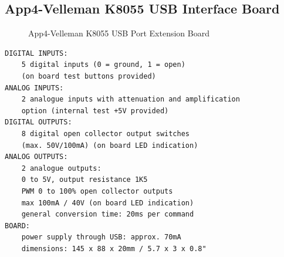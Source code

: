 \clearpage
\pagebreak		
		
\subsection{App4-Velleman K8055 USB Interface Board}
	
\begin{figure}[htbp]
	\begin{center}
\caption{App4-Velleman K8055 USB Port Extension Board}
\label{fig:App4-Captured-Velleman-K8055-USB-Extension-Board.jpg}
	\end{center}
\end{figure}

\lstset{basicstyle=\ttfamily\small}
\begin{lstlisting}[breaklines, frame=single, caption={App4-Specifications of Velleman K8055 USB Interface Board}, label=App4-Specifications-Velleman-K8055-USB-Interface-Board]
DIGITAL INPUTS:
    5 digital inputs (0 = ground, 1 = open) 
    (on board test buttons provided)
ANALOG INPUTS:
    2 analogue inputs with attenuation and amplification 
    option (internal test +5V provided)
DIGITAL OUTPUTS:
    8 digital open collector output switches 
    (max. 50V/100mA) (on board LED indication)
ANALOG OUTPUTS:
    2 analogue outputs:
    0 to 5V, output resistance 1K5
    PWM 0 to 100% open collector outputs 
    max 100mA / 40V (on board LED indication)
    general conversion time: 20ms per command
BOARD:    
    power supply through USB: approx. 70mA
    dimensions: 145 x 88 x 20mm / 5.7 x 3 x 0.8"
\end{lstlisting}


\clearpage
\pagebreak

